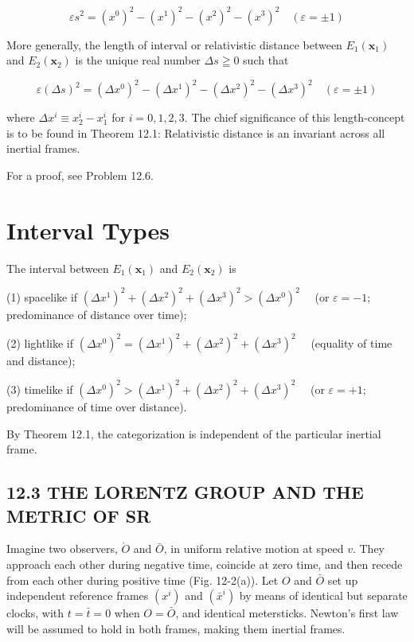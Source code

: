 \documentclass[10pt]{article}
\begin{document}
$$
\varepsilon s^{2}=\left(x^{0}\right)^{2}-\left(x^{1}\right)^{2}-\left(x^{2}\right)^{2}-\left(x^{3}\right)^{2} \quad(\varepsilon= \pm 1)
$$

More generally, the length of interval or relativistic distance between $E_{1}\left(\mathbf{x}_{1}\right)$ and $E_{2}\left(\mathbf{x}_{2}\right)$ is the unique real number $\Delta s \geqq 0$ such that


\begin{equation*}
\varepsilon(\Delta s)^{2}=\left(\Delta x^{0}\right)^{2}-\left(\Delta x^{1}\right)^{2}-\left(\Delta x^{2}\right)^{2}-\left(\Delta x^{3}\right)^{2} \quad(\varepsilon= \pm 1) \tag{12.3}
\end{equation*}


where $\Delta x^{i} \equiv x_{2}^{i}-x_{1}^{i}$ for $i=0,1,2,3$. The chief significance of this length-concept is to be found in Theorem 12.1: Relativistic distance is an invariant across all inertial frames.

For a proof, see Problem 12.6.

\section*{Interval Types}
The interval between $E_{1}\left(\mathbf{x}_{1}\right)$ and $E_{2}\left(\mathbf{x}_{2}\right)$ is

(1) spacelike if $\left(\Delta x^{1}\right)^{2}+\left(\Delta x^{2}\right)^{2}+\left(\Delta x^{3}\right)^{2}>\left(\Delta x^{0}\right)^{2} \quad$ (or $\varepsilon=-1$; predominance of distance over time);

(2) lightlike if $\left(\Delta x^{0}\right)^{2}=\left(\Delta x^{1}\right)^{2}+\left(\Delta x^{2}\right)^{2}+\left(\Delta x^{3}\right)^{2} \quad$ (equality of time and distance);

(3) timelike if $\left(\Delta x^{0}\right)^{2}>\left(\Delta x^{1}\right)^{2}+\left(\Delta x^{2}\right)^{2}+\left(\Delta x^{3}\right)^{2} \quad$ (or $\varepsilon=+1$; predominance of time over distance).

By Theorem 12.1, the categorization is independent of the particular inertial frame.

\subsection*{12.3 THE LORENTZ GROUP AND THE METRIC OF SR}
Imagine two observers, $\dot{O}$ and $\bar{O}$, in uniform relative motion at speed $v$. They approach each other during negative time, coincide at zero time, and then recede from each other during positive time (Fig. 12-2(a)). Let $O$ and $\bar{O}$ set up independent reference frames $\left(x^{i}\right)$ and $\left(\bar{x}^{i}\right)$ by means of identical but separate clocks, with $t=\bar{t}=0$ when $O=\bar{O}$, and identical metersticks. Newton's first law will be assumed to hold in both frames, making them inertial frames.
\end{document}
